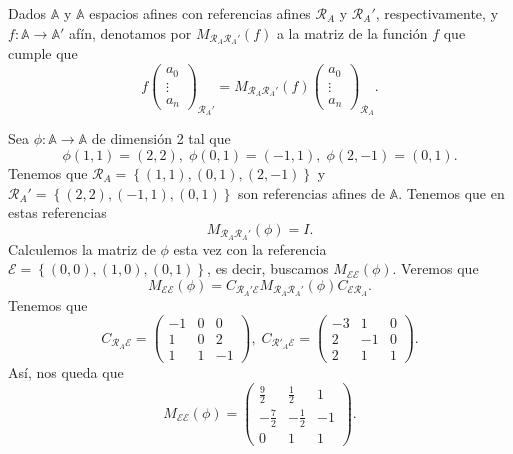\begin{notation}
Dados $\displaystyle \mathbb{A} $ y $\displaystyle \mathbb{A} $ espacios afines con referencias afines $\displaystyle \mathcal{R}_{A} $ y $\displaystyle \mathcal{R}_{A}' $, respectivamente, y $\displaystyle f : \mathbb{A} \to \mathbb{A}' $ afín, denotamos por $\displaystyle M_{\mathcal{R}_{A}\mathcal{R}_{A}'}\left(f\right) $ a la matriz de la función $\displaystyle f $ que cumple que
\[f \begin{pmatrix} a_{0} \\ \vdots \\ a_{n} \end{pmatrix}_{\mathcal{R}_{A}'} = M_{\mathcal{R}_{A}\mathcal{R}_{A}'}\left(f\right) \begin{pmatrix} a_{0} \\ \vdots \\ a_{n} \end{pmatrix}_{\mathcal{R}_{A}} .\]
\end{notation}
\begin{eg}
Sea $\displaystyle \phi : \mathbb{A} \to \mathbb{A} $ de dimensión 2 tal que 
\[\phi\left(1,1\right) = \left(2,2\right), \; \phi\left(0,1\right) = \left(-1,1\right), \; \phi\left(2,-1\right) = \left(0,1\right) .\]
Tenemos que $\displaystyle \mathcal{R}_{A} = \left\{ \left(1,1\right), \left(0,1\right), \left(2,-1\right)\right\}  $ y $\displaystyle \mathcal{R}_{A}' = \left\{ \left(2,2\right), \left(-1,1\right), \left(0,1\right)\right\} $ son referencias afines de $\displaystyle \mathbb{A} $. Tenemos que en estas referencias 
\[M_{\mathcal{R}_{A}\mathcal{R}_{A}'}\left(\phi\right) = I .\]
Calculemos la matriz de $\displaystyle \phi $ esta vez con la referencia $\displaystyle \mathcal{E} = \left\{ \left(0,0\right), \left(1,0\right), \left(0,1\right)\right\}  $, es decir, buscamos $\displaystyle M_{\mathcal{E}\mathcal{E}}\left(\phi\right) $. Veremos que
\[M_{\mathcal{E}\mathcal{E}}\left(\phi\right) = C_{\mathcal{R}_{A}'\mathcal{E}} M _{\mathcal{R}_{A}\mathcal{R}_{A}'}\left(\phi\right) C_{\mathcal{E}\mathcal{R}_{A}} .\]
Tenemos que 
\[C_{\mathcal{R}_{A}\mathcal{E}} = \begin{pmatrix} -1 & 0 & 0 \\ 1 & 0 & 2 \\ 1 & 1 & -1 \end{pmatrix}, \; C_{\mathcal{R}'_{A}\mathcal{E}} = \begin{pmatrix} -3 & 1 & 0 \\ 2 & - 1 & 0 \\ 2 & 1 & 1 \end{pmatrix} .\]
Así, nos queda que
\[M_{\mathcal{E}\mathcal{E}}\left(\phi\right) = \begin{pmatrix} \frac{9}{2} & \frac{1}{2} & 1 \\ -\frac{7}{2} & -\frac{1}{2} & -1 \\ 0 & 1 & 1\end{pmatrix} .\]
\end{eg}
